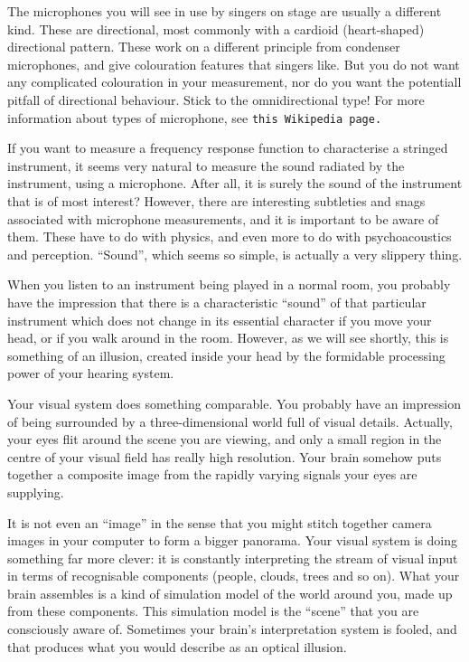   The microphones you will see in use by singers on stage are usually a 
  different kind. These are directional, most commonly with a cardioid 
  (heart-shaped) directional pattern. These work on a different principle from 
  condenser microphones, and give colouration features that singers like. But 
  you do not want any complicated colouration in your measurement, nor do you 
  want the potentiall pitfall of directional behaviour. Stick to the 
  omnidirectional type! For more information about types of microphone, see 
  \tt{}this Wikipedia page\rm{}. 

  If you want to measure a frequency response function to characterise a 
  stringed instrument, it seems very natural to measure the sound radiated by 
  the instrument, using a microphone. After all, it is surely the sound of the 
  instrument that is of most interest? However, there are interesting 
  subtleties and snags associated with microphone measurements, and it is 
  important to be aware of them. These have to do with physics, and even more 
  to do with psychoacoustics and perception. “Sound”, which seems so simple, is 
  actually a very slippery thing. 

  When you listen to an instrument being played in a normal room, you probably 
  have the impression that there is a characteristic “sound” of that particular 
  instrument which does not change in its essential character if you move your 
  head, or if you walk around in the room. However, as we will see shortly, 
  this is something of an illusion, created inside your head by the formidable 
  processing power of your hearing system. 

  Your visual system does something comparable. You probably have an impression 
  of being surrounded by a three-dimensional world full of visual details. 
  Actually, your eyes flit around the scene you are viewing, and only a small 
  region in the centre of your visual field has really high resolution. Your 
  brain somehow puts together a composite image from the rapidly varying 
  signals your eyes are supplying. 

  It is not even an “image” in the sense that you might stitch together camera 
  images in your computer to form a bigger panorama. Your visual system is 
  doing something far more clever: it is constantly interpreting the stream of 
  visual input in terms of recognisable components (people, clouds, trees and 
  so on). What your brain assembles is a kind of simulation model of the world 
  around you, made up from these components. This simulation model is the 
  ``scene'' that you are consciously aware of. Sometimes your brain's 
  interpretation system is fooled, and that produces what you would describe as 
  an optical illusion. 

